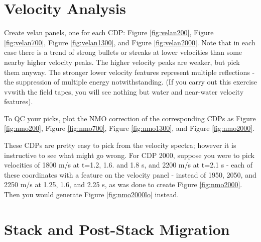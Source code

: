 
\section{Velocity Analysis}
Create velan panels, one for each CDP: Figure \ref{fig:velan200}, Figure \ref{fig:velan700}, Figure \ref{fig:velan1300}, and Figure \ref{fig:velan2000}. Note that in each case there is a trend of strong bullets or streaks at lower velocities than some nearby higher velocity peaks. The higher velocity peaks are weaker, but pick them anyway. The stronger lower velocity features represent multiple reflections - the suppression of multiple energy notwithstanding. (If you carry out this exercise vvwith the field tapes, you will see nothing but water and near-water velocity features).


To QC your picks, plot the NMO correction of the corresponding CDPs as Figure \ref{fig:nmo200}, Figure \ref{fig:nmo700}, Figure \ref{fig:nmo1300}, and Figure \ref{fig:nmo2000}.


These CDPs are pretty easy to pick from the velocity spectra; however it is instructive to see what might go wrong. For CDP 2000, suppose you were to pick velocities of 1800 m/s at t=1.2, 1.6. and 1.8  s, and 2200 m/s at t=2.1 s - each of these coordinates with a feature on the velocity panel - instead of 1950, 2050, and 2250 m/s at 1.25, 1.6, and 2.25 s, as was done to create Figure \ref{fig:nmo2000}. Then you would generate Figure \ref{fig:nmo2000lo} instead. 


\section{Stack and Post-Stack Migration}

